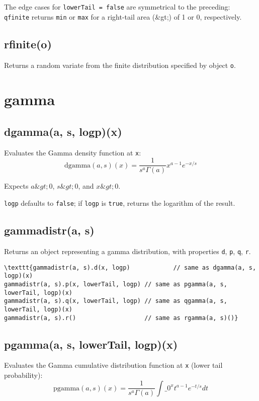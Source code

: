 \documentclass{article}
\begin{document}
The edge cases for \texttt{lowerTail = false} are symmetrical to the preceding:
\texttt{qfinite} returns \texttt{min} or \texttt{max} for a right-tail area (\&gt;) of 1 or 0, respectively.


    \subsection*{rfinite(o)}
    Returns a random variate from the finite distribution
specified by object \texttt{o}.


  \section{gamma}
    \subsection*{dgamma(a, s, logp)(x)}
    Evaluates the Gamma density function at \texttt{x}:
$$\textrm{dgamma}(a, s)(x) = \frac{1}{s^a\Gamma(a)}x^{a-1}e^{-x/s}$$


Expects $a \&gt; 0$, $s \&gt; 0$, and $x \&gt; 0$.


\texttt{logp} defaults to \texttt{false}; if \texttt{logp} is \texttt{true}, returns the
logarithm of the result.


    \subsection*{gammadistr(a, s)}
    Returns an object representing a gamma distribution, with properties \texttt{d}, \texttt{p}, \texttt{q}, \texttt{r}.


\begin{lstlisting}
\texttt{gammadistr(a, s).d(x, logp)            // same as dgamma(a, s, logp)(x)
gammadistr(a, s).p(x, lowerTail, logp) // same as pgamma(a, s, lowerTail, logp)(x)
gammadistr(a, s).q(x, lowerTail, logp) // same as qgamma(a, s, lowerTail, logp)(x)
gammadistr(a, s).r()                   // same as rgamma(a, s)()}\end{lstlisting}

    \subsection*{pgamma(a, s, lowerTail, logp)(x)}
    Evaluates the Gamma cumulative distribution
function at \texttt{x} (lower tail probability):
$$\textrm{pgamma}(a, s)(x) = \frac{1}{s^a\Gamma(a)}\int\_0^x t^{a-1}e^{-t/s}dt$$
\end{document}
